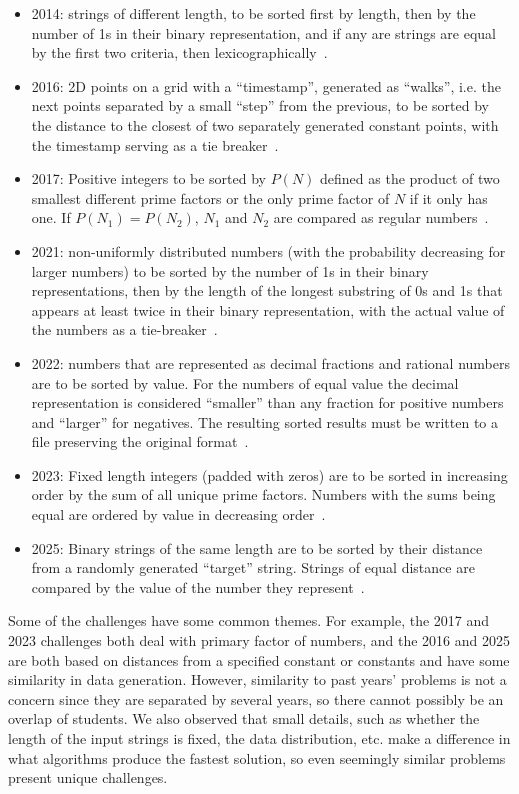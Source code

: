 \documentclass[12pt]{article}
\begin{document}
\begin{itemize}
\item 2014: strings of different length, to be sorted first by length, then by the number of 1s in their binary representation, and if any are strings are equal by the first two criteria, then lexicographically~\cite{sorting2014}.
\item 2016: 2D points on a grid with a ``timestamp'', generated as ``walks'', i.e. the next points separated by a small ``step'' from the previous, to be sorted by the distance to the closest of two separately generated constant points, with the timestamp serving as a tie breaker~\cite{sorting2016}.
\item 2017: Positive integers to be sorted by $P(N)$ defined as the product of two smallest different prime factors or the only prime factor of $N$ if it only has one. If $P(N_1) = P(N_2)$, $N_1$ and  $N_2$ are compared as regular numbers~\cite{sorting2017}.
\item 2021: non-uniformly distributed numbers (with the probability decreasing for larger numbers) to be sorted by the number of 1s in their binary representations, then by the length of the longest substring of 0s and 1s that appears at least twice in their binary representation, with the actual value of the numbers as a tie-breaker~\cite{sorting2021}. 
\item 2022: numbers that are represented as decimal fractions and rational numbers are to be sorted  by value.  For the numbers of equal value the decimal representation is considered ``smaller'' than any fraction for positive numbers and ``larger'' for negatives. The resulting sorted results must be written to a file preserving the original format~\cite{sorting2022}. 
\item 2023: Fixed length integers (padded with zeros) are to be sorted in increasing order by the sum of all unique prime factors. Numbers with the sums being equal are ordered by value in decreasing order~\cite{sorting2023}.
\item 2025: Binary strings of the same length are to be sorted by their distance from a randomly generated ``target'' string. Strings of equal distance are compared by the value of the number they represent~\cite{sorting2025}.
\end{itemize}
Some of the challenges have some common themes. For example, the 2017 and 2023 challenges both deal with primary factor of numbers, and the 2016 and 2025 are both based on distances from a specified constant or constants and have some similarity in data generation. 
However, similarity to past years' problems is not a concern since they are separated by several years, so there cannot possibly be an overlap of students. We also observed that small details, such as whether the length of the input strings is fixed, the data distribution, etc. make a difference in what algorithms produce the fastest solution, so even seemingly similar problems present unique challenges. 
\end{document}
